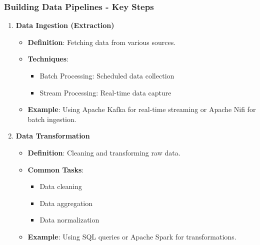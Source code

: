 \documentclass{beamer}
\begin{document}
\begin{frame}[fragile]
    \frametitle{Building Data Pipelines - Key Steps}
    \begin{enumerate}
        \item \textbf{Data Ingestion (Extraction)}
            \begin{itemize}
                \item \textbf{Definition}: Fetching data from various sources.
                \item \textbf{Techniques}:
                    \begin{itemize}
                        \item Batch Processing: Scheduled data collection
                        \item Stream Processing: Real-time data capture
                    \end{itemize}
                \item \textbf{Example}: Using Apache Kafka for real-time streaming or Apache Nifi for batch ingestion.
            \end{itemize}
        
        \item \textbf{Data Transformation}
            \begin{itemize}
                \item \textbf{Definition}: Cleaning and transforming raw data.
                \item \textbf{Common Tasks}:
                    \begin{itemize}
                        \item Data cleaning
                        \item Data aggregation
                        \item Data normalization
                    \end{itemize}
                \item \textbf{Example}: Using SQL queries or Apache Spark for transformations.
            \end{itemize}
    \end{enumerate}
\end{frame}
\end{document}
